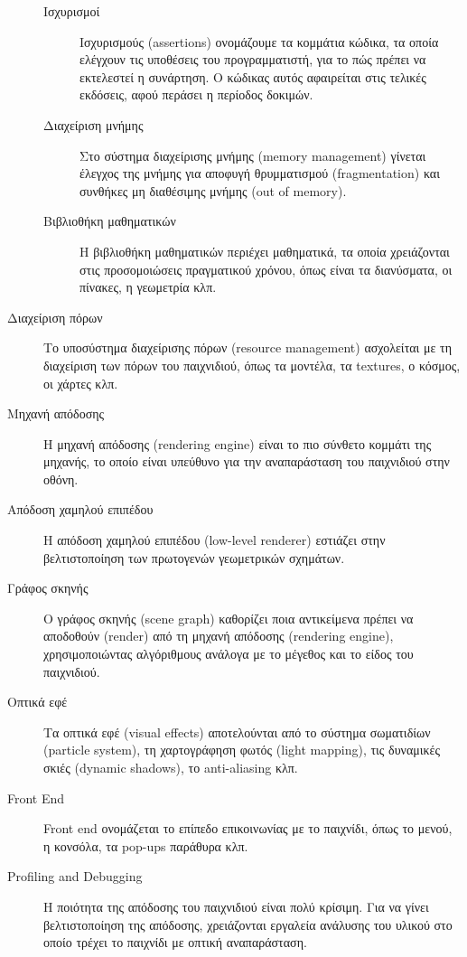 \begin{description}
	\begin{description}
	\item [Ισχυρισμοί]	Ισχυρισμούς (assertions) ονομάζουμε τα κομμάτια κώδικα, τα οποία ελέγχουν τις υποθέσεις του προγραμματιστή, για το πώς πρέπει να εκτελεστεί η συνάρτηση. Ο κώδικας αυτός αφαιρείται στις τελικές εκδόσεις, αφού περάσει η περίοδος δοκιμών.
	
	\item [Διαχείριση μνήμης]Στο σύστημα διαχείρισης μνήμης (memory management) γίνεται έλεγχος της μνήμης για αποφυγή θρυμματισμού (fragmentation) και συνθήκες μη διαθέσιμης μνήμης (out of memory).
	
	\item [Βιβλιοθήκη μαθηματικών]Η βιβλιοθήκη μαθηματικών περιέχει μαθηματικά, τα οποία χρειάζονται στις προσομοιώσεις πραγματικού χρόνου, όπως είναι τα διανύσματα, οι πίνακες, η γεωμετρία κλπ.
	\end{description}

\item [Διαχείριση πόρων]Το υποσύστημα διαχείρισης πόρων (resource management) ασχολείται με τη διαχείριση των πόρων του παιχνιδιού, όπως τα μοντέλα, τα textures, ο κόσμος, οι χάρτες κλπ.

\item [Μηχανή απόδοσης] Η μηχανή απόδοσης (rendering engine) είναι το πιο σύνθετο κομμάτι της μηχανής, το οποίο είναι υπεύθυνο για την αναπαράσταση του παιχνιδιού στην οθόνη.
 
\item [Απόδοση χαμηλού επιπέδου]Η απόδοση χαμηλού επιπέδου (low-level renderer) εστιάζει στην βελτιστοποίηση των πρωτογενών γεωμετρικών σχημάτων.

\item [Γράφος σκηνής]Ο γράφος σκηνής (scene graph) καθορίζει ποια αντικείμενα πρέπει να αποδοθούν (render) από τη μηχανή απόδοσης (rendering engine), χρησιμοποιώντας αλγόριθμους ανάλογα με το μέγεθος και το είδος του παιχνιδιού.

\item [Οπτικά εφέ] Τα οπτικά εφέ (visual effects) αποτελούνται από το σύστημα σωματιδίων (particle system), τη χαρτογράφηση φωτός (light mapping), τις δυναμικές σκιές (dynamic shadows), το anti-aliasing κλπ.
 
\item [Front End]Front end ονομάζεται το επίπεδο επικοινωνίας με το παιχνίδι, όπως το μενού, η κονσόλα, τα pop-ups παράθυρα κλπ.

\item [Profiling and Debugging]Η ποιότητα της απόδοσης του παιχνιδιού είναι πολύ κρίσιμη. Για να γίνει βελτιστοποίηση της απόδοσης, χρειάζονται εργαλεία ανάλυσης του υλικού στο οποίο τρέχει το παιχνίδι με οπτική αναπαράσταση.


\end{description}
